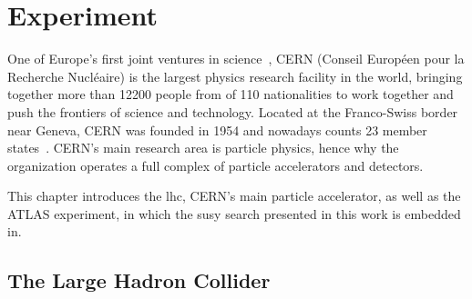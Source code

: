
\chapter{Experiment} 

\ifpdf
    \graphicspath{{chapter-experiment/Figs/Raster/}{chapter-experiment/Figs/PDF/}{chapter-experiment/Figs/}}
\else
    \graphicspath{{chapter-experiment/Figs/Vector/}{chapter-experiment/Figs/}}
\fi


One of Europe's first joint ventures in science~\cite{About:1997225}, CERN (Conseil Européen pour la Recherche Nucléaire) is the largest physics research facility in the world, bringing together more than \num[group-separator={,}]{12200} people from of 110 nationalities to work together and push the frontiers of science and technology. Located at the Franco-Swiss border near Geneva, CERN was founded in 1954 and nowadays counts 23 member states~\cite{About:1997225}. CERN's main research area is particle physics, hence why the organization operates a full complex of particle accelerators and detectors.

This chapter introduces the \gls{lhc}, CERN's main particle accelerator, as well as the ATLAS experiment, in which the \gls{susy} search presented in this work is embedded in.

\section{The Large Hadron Collider}\label{sec:lhc}

